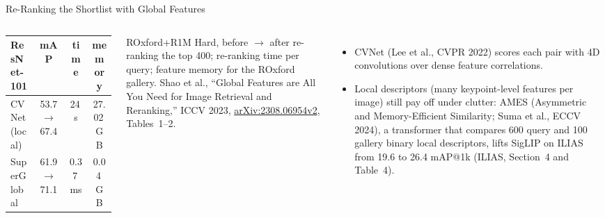\begin{frame}{Re-Ranking the Shortlist with Global Features}
\begin{columns}[T,onlytextwidth]
{\begin{tabular}{@{}lccc@{}}
        \toprule
        ResNet-101 & mAP & time & memory \\
        \midrule
        CVNet (local) & 53.7 $\to$ 67.4 & 24\,s & 27.02\,GB \\
        SuperGlobal & 61.9 $\to$ 71.1 & 0.37\,ms & 0.04\,GB \\
        \bottomrule
      \end{tabular}\par}
      \vspace{0.2em}
      {\scriptsize ROxford+R1M Hard, before $\to$ after re-ranking the top 400; re-ranking time per query; feature memory for the ROxford gallery. Shao et al., ``Global Features are All You Need for Image Retrieval and Reranking,'' ICCV 2023, \href{https://arxiv.org/abs/2308.06954v2}{arXiv:2308.06954v2}, Tables~1--2.\par}
      \begin{itemize}\scriptsize\itemsep0.3em
        \item CVNet (Lee et al., CVPR 2022) scores each pair with 4D convolutions over dense feature correlations.
        \item Local descriptors (many keypoint-level features per image) still pay off under clutter: AMES (Asymmetric and Memory-Efficient Similarity; Suma et al., ECCV 2024), a transformer that compares 600 query and 100 gallery binary local descriptors, lifts SigLIP on ILIAS from 19.6 to 26.4 mAP@1k (ILIAS, Section~4 and Table~4).
      \end{itemize}
  \end{columns}
\end{frame}

